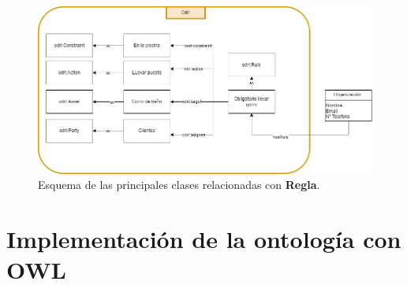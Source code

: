 \documentclass[a4paper,12pt]{article}
\begin{document}
	\begin{figure}[H]
		\centering
		\includegraphics[width=\textwidth]{include/reglas.jpg}
		\caption{Esquema de las principales clases relacionadas con \textbf{Regla}.}
	\end{figure}
	
	\section{Implementación de la ontología con OWL}
	
\end{document}
